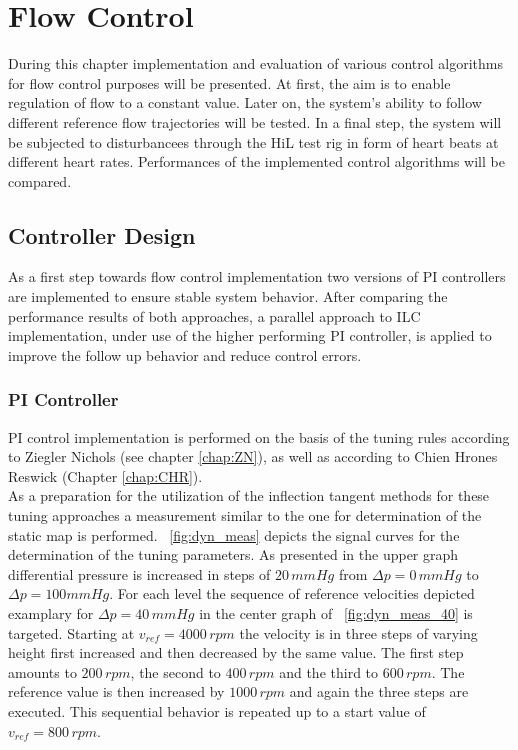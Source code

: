 \chapter{Flow Control}
During this chapter implementation and evaluation of various control algorithms for flow control purposes will be presented. At first, the aim is to enable regulation of flow to a constant value. Later on, the system's ability to follow different reference flow trajectories will be tested. In a final step, the system will be subjected to disturbancees through the HiL test rig in form of heart beats at different heart rates. Performances of the implemented control algorithms will be compared.

\section{Controller Design}
As a first step towards flow control implementation two versions of PI controllers are implemented to ensure stable system behavior. After comparing the performance results of both approaches, a parallel approach to ILC implementation, under use of the higher performing PI controller, is applied to improve the follow up behavior and reduce control errors.

\subsection{PI Controller}
PI control implementation is performed on the basis of the tuning rules according to Ziegler Nichols (see chapter \ref{chap:ZN}), as well as according to Chien Hrones Reswick (Chapter \ref{chap:CHR}).
\\As a preparation for the utilization of the inflection tangent methods for these tuning approaches a measurement similar to the one for determination of the static map is performed. \figurename~\ref{fig:dyn_meas} depicts the signal curves for the determination of the tuning parameters. As presented in the upper graph differential pressure is increased in steps of $20\,mmHg$ from $\Delta{p}=0\,mmHg$ to $\Delta{p}=100mmHg$. For each level the sequence of reference velocities depicted examplary for $\Delta{p}=40\,mmHg$ in the center graph of \figurename~\ref{fig:dyn_meas_40} is targeted. Starting at $v_{ref}=4000 \, rpm $ the velocity is in three steps of varying height first increased and  then decreased by the same value. The first step amounts to $200 \, rpm$, the second to $400\,rpm$ and the third to $600 \, rpm$. The reference value is then increased by $1000\,rpm$ and again the three steps are executed. This sequential behavior is repeated up to a start value of $v_{ref}=800\,rpm$.

